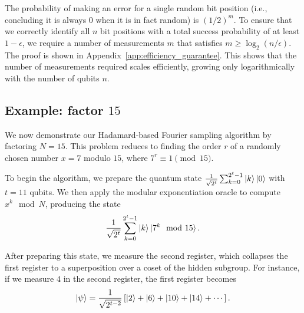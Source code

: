 \documentclass[aps,reprint,showpacs,tightenlines, twocolumn]{revtex4-2}
\begin{document}
The probability of making an error for a single random bit position (i.e., concluding it is always 0 when it is in fact random) is $(1/2)^m$. To ensure that we correctly identify all $n$ bit positions with a total success probability of at least $1-\epsilon$, we require a number of measurements $m$ that satisfies $m \ge \log_2(n / \epsilon)$. The proof is shown in Appendix~\ref{app:efficiency_guarantee}. This shows that the number of measurements required scales efficiently, growing only logarithmically with the number of qubits $n$.



\subsection{Example: factor $15$}

We now demonstrate our Hadamard-based Fourier sampling algorithm by factoring $N = 15$. This problem reduces to finding the order $r$ of a randomly chosen number $x = 7$ modulo $15$, where $7^r \equiv 1 \pmod{15}$.

To begin the algorithm, we prepare the quantum state $\frac{1}{\sqrt{2^t}}\sum_{k=0}^{2^t-1} \ket{k}\ket{0}$ with $t = 11$ qubits. We then apply the modular exponentiation oracle to compute $x^k \mod N$, producing the state
\begin{equation}
\frac{1}{\sqrt{2^t}}\sum_{k=0}^{2^t-1} \ket{k}\ket{7^k \mod 15}.
\end{equation}

After preparing this state, we measure the second register, which collapses the first register to a superposition over a coset of the hidden subgroup. For instance, if we measure $4$ in the second register, the first register becomes
\begin{equation}
\ket{\psi} = \frac{1}{\sqrt{2^{t-2}}}\left[\ket{2} + \ket{6} + \ket{10} + \ket{14} + \cdots\right].
\end{equation}


\end{document}
